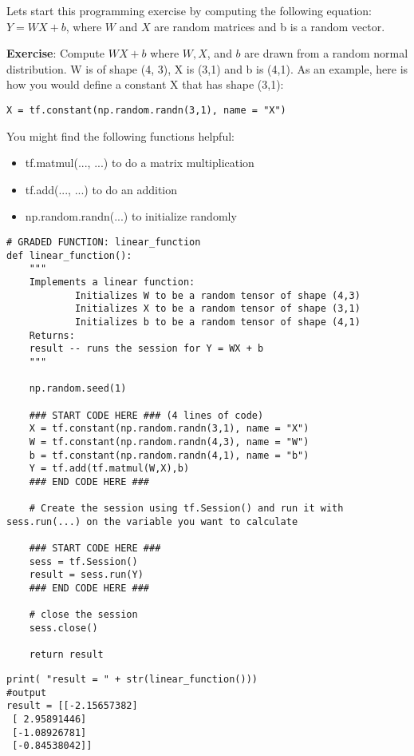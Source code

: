 

Lets start this programming exercise by computing the following equation: $Y = WX + b$, where $W$ and $X$ are random matrices and b is a random vector. 

{\textbf {Exercise}}: Compute $WX + b$ where $W, X$, and $b$ are drawn from a random normal distribution. W is of shape (4, 3), X is (3,1) and b is (4,1). As an example, here is how you would define a constant X that has shape (3,1):
\begin{verbatim}
X = tf.constant(np.random.randn(3,1), name = "X")
\end{verbatim}

You might find the following functions helpful: 
\begin{itemize}
\item tf.matmul(..., ...) to do a matrix multiplication
\item tf.add(..., ...) to do an addition
\item np.random.randn(...) to initialize randomly
\end{itemize}

\begin{verbatim}
# GRADED FUNCTION: linear_function
def linear_function():
    """
    Implements a linear function: 
            Initializes W to be a random tensor of shape (4,3)
            Initializes X to be a random tensor of shape (3,1)
            Initializes b to be a random tensor of shape (4,1)
    Returns: 
    result -- runs the session for Y = WX + b 
    """
    
    np.random.seed(1)
    
    ### START CODE HERE ### (4 lines of code)
    X = tf.constant(np.random.randn(3,1), name = "X")
    W = tf.constant(np.random.randn(4,3), name = "W")
    b = tf.constant(np.random.randn(4,1), name = "b")
    Y = tf.add(tf.matmul(W,X),b)
    ### END CODE HERE ### 
    
    # Create the session using tf.Session() and run it with sess.run(...) on the variable you want to calculate
    
    ### START CODE HERE ###
    sess = tf.Session()
    result = sess.run(Y)
    ### END CODE HERE ### 
    
    # close the session 
    sess.close()

    return result
\end{verbatim}   

\begin{verbatim}  
print( "result = " + str(linear_function()))  
#output 
result = [[-2.15657382]
 [ 2.95891446]
 [-1.08926781]
 [-0.84538042]]  
\end{verbatim}  



